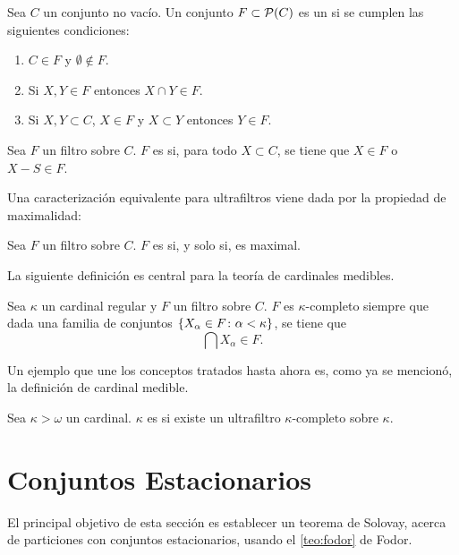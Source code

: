 \begin{defi}
    Sea $C$ un conjunto no vacío. Un conjunto $F\subset \mathcal{P}(C)$ es un
     si se cumplen las siguientes condiciones:
    \begin{enumerate}[label=\alph*)]
        \item $C\in F$ y $\emptyset\notin F$.
        \item Si $X,Y\in F$ entonces $X\cap Y\in F$.
        \item Si $X,Y\subset C$, $X\in F$ y $X\subset Y$ entonces $Y\in F$.
    \end{enumerate}
\end{defi}

\begin{defi}
    Sea $F$ un filtro sobre $C$. $F$ es  si, para todo $X\subset C$,
    se tiene que $X\in F$ o $X-S\in F$.
\end{defi}

Una caracterización equivalente para ultrafiltros viene dada por la propiedad
de maximalidad:

\begin{teo}
    Sea $F$ un filtro sobre $C$. $F$ es  si, y solo si, es maximal.
\end{teo}

La siguiente definición es central para la teoría de cardinales medibles.

\begin{defi}
    Sea $\kappa$ un cardinal regular y $F$ un filtro sobre $C$.
    $F$ es $\kappa$-completo siempre que dada una familia de conjuntos
    $\left\{ X_\alpha\in F\colon \alpha<\kappa \right\}$,
    se tiene que
    \[
        \bigcap X_\alpha \in F.
    \]
\end{defi}

Un ejemplo que une los conceptos tratados hasta ahora es, como ya se mencionó,
la definición de cardinal medible.

\begin{defi}
    Sea $\kappa > \omega$ un cardinal. $\kappa$ es  si existe
    un ultrafiltro $\kappa\text{-completo}$ sobre $\kappa$.
\end{defi}

\section{Conjuntos Estacionarios}

El principal objetivo de esta sección es establecer un teorema
de Solovay, acerca de particiones
con conjuntos estacionarios, usando el \cref{teo:fodor}
de Fodor.

